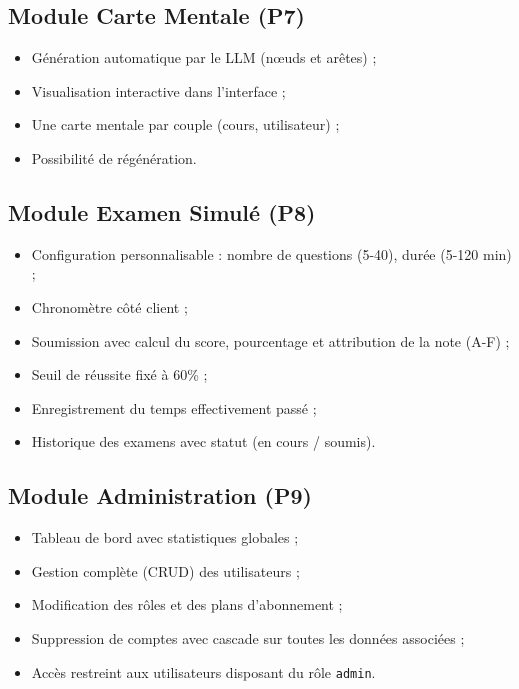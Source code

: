 \subsection{Module Carte Mentale (P7)}
\begin{itemize}
  \item Génération automatique par le LLM (nœuds et arêtes) ;
  \item Visualisation interactive dans l'interface ;
  \item Une carte mentale par couple (cours, utilisateur) ;
  \item Possibilité de régénération.
\end{itemize}

\subsection{Module Examen Simulé (P8)}
\begin{itemize}
  \item Configuration personnalisable : nombre de questions (5-40), durée (5-120 min) ;
  \item Chronomètre côté client ;
  \item Soumission avec calcul du score, pourcentage et attribution de la note (A-F) ;
  \item Seuil de réussite fixé à 60\% ;
  \item Enregistrement du temps effectivement passé ;
  \item Historique des examens avec statut (en cours / soumis).
\end{itemize}

\subsection{Module Administration (P9)}
\begin{itemize}
  \item Tableau de bord avec statistiques globales ;
  \item Gestion complète (CRUD) des utilisateurs ;
  \item Modification des rôles et des plans d'abonnement ;
  \item Suppression de comptes avec cascade sur toutes les données associées ;
  \item Accès restreint aux utilisateurs disposant du rôle \texttt{admin}.
\end{itemize}

